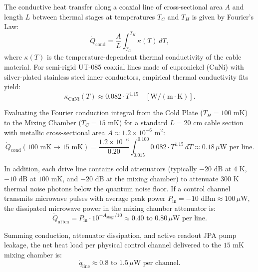 The conductive heat transfer along a coaxial line of cross-sectional area $A$ and length $L$ between thermal stages at temperatures $T_C$ and $T_H$ is given by Fourier's Law:
\begin{equation}
    \dot{Q}_{\text{cond}} = \frac{A}{L} \int_{T_C}^{T_H} \kappa(T)\,dT,
    \label{eq:fourier_heat_conduction_full}
\end{equation}
where $\kappa(T)$ is the temperature-dependent thermal conductivity of the cable material. For semi-rigid UT-085 coaxial lines made of cupronickel (CuNi) with silver-plated stainless steel inner conductors, empirical thermal conductivity fits yield:
\begin{equation}
    \kappa_{\text{CuNi}}(T) \approx 0.082 \cdot T^{1.15} \quad [\text{W}/(\text{m}\cdot\text{K})].
\end{equation}

Evaluating the Fourier conduction integral from the Cold Plate ($T_H = 100\text{ mK}$) to the Mixing Chamber ($T_C = 15\text{ mK}$) for a standard $L = 20\text{ cm}$ cable section with metallic cross-sectional area $A \approx 1.2 \times 10^{-6}\text{ m}^2$:
\begin{equation}
    \dot{Q}_{\text{cond}}(100\text{ mK} \to 15\text{ mK}) = \frac{1.2 \times 10^{-6}}{0.20} \int_{0.015}^{0.100} 0.082 \cdot T^{1.15}\,dT \approx 0.18\,\mu\text{W per line}.
\end{equation}

In addition, each drive line contains cold attenuators (typically $-20\text{ dB}$ at $4\text{ K}$, $-10\text{ dB}$ at $100\text{ mK}$, and $-20\text{ dB}$ at the mixing chamber) to attenuate $300\text{ K}$ thermal noise photons below the quantum noise floor. If a control channel transmits microwave pulses with average peak power $P_{\text{in}} = -10\text{ dBm} \approx 100\,\mu\text{W}$, the dissipated microwave power in the mixing chamber attenuator is:
\begin{equation}
    \dot{Q}_{\text{atten}} = P_{\text{in}} \cdot 10^{-A_{\text{stage}}/10} \approx 0.40\text{ to }0.80\,\mu\text{W per line}.
\end{equation}

Summing conduction, attenuator dissipation, and active readout JPA pump leakage, the net heat load per physical control channel delivered to the $15\text{ mK}$ mixing chamber is:
\begin{equation}
    \dot{q}_{\text{line}} \approx 0.8\text{ to }1.5\,\mu\text{W per channel}.
\end{equation}

